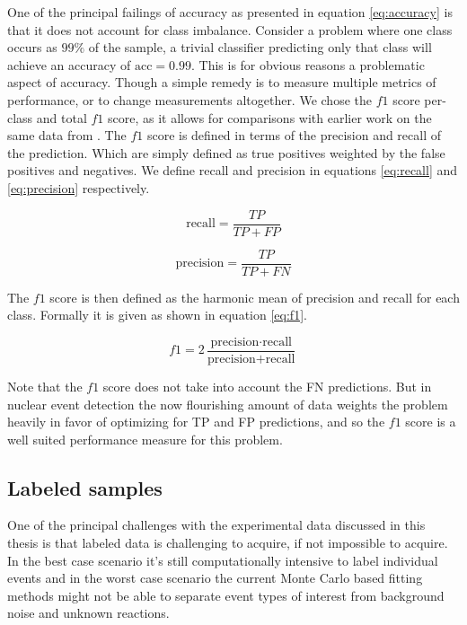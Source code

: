 \noindent One of the principal failings of accuracy as presented in equation \ref{eq:accuracy} is that it does not account for class imbalance. Consider a problem where one class occurs as $99\%$ of the sample, a trivial classifier predicting only that class will achieve an accuracy of $\text{acc}=0.99$. This is for obvious reasons a problematic aspect of accuracy. Though a simple remedy is to measure multiple metrics of performance, or to change measurements altogether. We chose the $f1$ score per-class and total $f1$ score, as it allows for comparisons with earlier work on the same data from \citet{Kuchera2019}. The $f1$ score is defined in terms of the precision and recall of the prediction. Which are simply defined as true positives weighted by the false positives and negatives. We define recall and precision in equations \ref{eq:recall} and \ref{eq:precision} respectively.

\begin{equation}\label{eq:recall}
\text{recall}= \frac{TP}{TP + FP}
\end{equation}

\begin{equation}\label{eq:precision}
\text{precision} = \frac{TP}{TP + FN}
\end{equation}

\noindent The $f1$ score is then defined as the harmonic mean of precision and recall for each class. Formally it is given as shown in equation \ref{eq:f1}.

\begin{equation}\label{eq:f1}
f1 = 2 \frac{\text{precision} \cdot \text{recall}}{\text{precision} + \text{recall}}
\end{equation}

\noindent Note that the $f1$ score does not take into account the FN predictions. But in nuclear event detection the now flourishing amount of data weights the problem heavily in favor of optimizing for TP and FP predictions, and so the $f1$ score is a well suited performance measure for this problem. 

\subsection{Labeled samples}

One of the principal challenges with the experimental data discussed in this thesis is that labeled data is challenging to acquire, if not impossible to acquire. In the best case scenario it's still computationally intensive to label individual events and in the worst case scenario the current Monte Carlo based fitting methods might not be able to separate event types of interest from background noise and unknown reactions.

